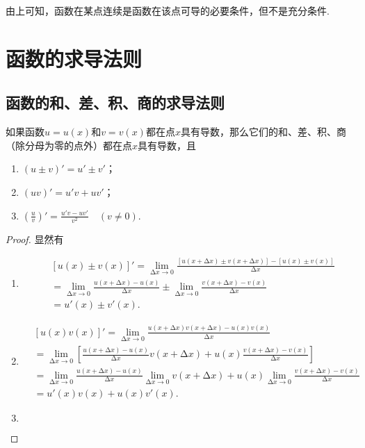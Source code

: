 由上可知，函数在某点连续是函数在该点可导的必要条件，但不是充分条件.

\section{函数的求导法则}
\subsection{函数的和、差、积、商的求导法则}
\begin{theorem}
如果函数\(u=u(x)\)和\(v=v(x)\)都在点\(x\)具有导数，那么它们的和、差、积、商（除分母为零的点外）都在点\(x\)具有导数，且
\begin{enumerate}
\item \((u \pm v)' = u' \pm v'\)；
\item \((uv)' = u'v + uv'\)；
\item \(\left(\frac{u}{v}\right)' = \frac{u'v - uv'}{v^2} \quad(v \neq 0)\).
\end{enumerate}
\begin{proof}
显然有
\begin{enumerate}
\item \begin{align*}
&[u(x) \pm v(x)]'
=\lim\limits_{\increment x\to0} \frac{[u(x+\increment x) \pm v(x+\increment x)]-[u(x) \pm v(x)]}{\increment x} \\
&=\lim\limits_{\increment x\to0} \frac{u(x+\increment x)-u(x)}{\increment x} \pm \lim\limits_{\increment x\to0} \frac{v(x+\increment x)-v(x)}{\increment x} \\
&=u'(x) \pm v'(x).
\end{align*}
\item \begin{align*}
&[u(x) v(x)]'
=\lim\limits_{\increment x\to0} \frac{u(x+\increment x) v(x+\increment x) - u(x) v(x)}{\increment x} \\
&=\lim\limits_{\increment x\to0} \left[
 \frac{u(x+\increment x) - u(x)}{\increment x} v(x+\increment x) + u(x) \frac{v(x+\increment x) - v(x)}{\increment x}
 \right] \\
&=\lim\limits_{\increment x\to0} \frac{u(x+\increment x) - u(x)}{\increment x} %
 \lim\limits_{\increment x\to0} v(x+\increment x) %
 + u(x) \lim\limits_{\increment x\to0} \frac{v(x+\increment x)-v(x)}{\increment x} \\
&=u'(x) v(x) + u(x) v'(x).
\end{align*}
\item \begin{align*}

\end{align*}
\end{enumerate}
\end{proof}
\end{theorem}
